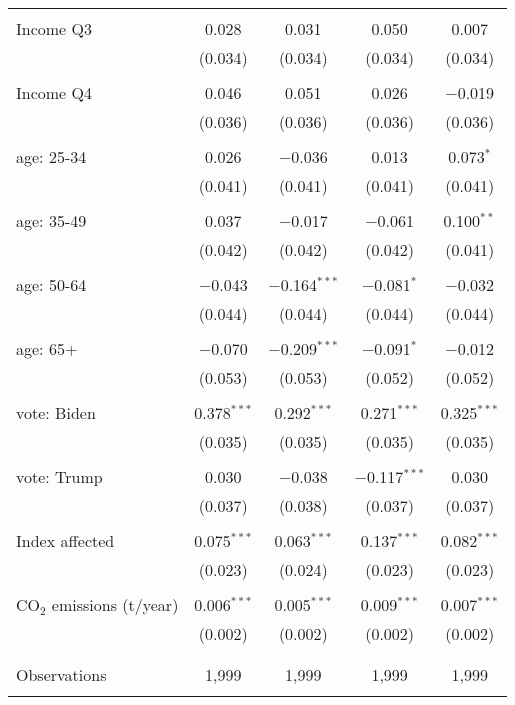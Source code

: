 \begin{tabular}{@{\extracolsep{5pt}}lcccc}
  & & & & \\ 
 Income Q3 & 0.028 & 0.031 & 0.050 & 0.007 \\ 
  & (0.034) & (0.034) & (0.034) & (0.034) \\ 
  & & & & \\ 
 Income Q4 & 0.046 & 0.051 & 0.026 & $-$0.019 \\ 
  & (0.036) & (0.036) & (0.036) & (0.036) \\ 
  & & & & \\ 
 age: 25-34 & 0.026 & $-$0.036 & 0.013 & 0.073$^{*}$ \\ 
  & (0.041) & (0.041) & (0.041) & (0.041) \\ 
  & & & & \\ 
 age: 35-49 & 0.037 & $-$0.017 & $-$0.061 & 0.100$^{**}$ \\ 
  & (0.042) & (0.042) & (0.042) & (0.041) \\ 
  & & & & \\ 
 age: 50-64 & $-$0.043 & $-$0.164$^{***}$ & $-$0.081$^{*}$ & $-$0.032 \\ 
  & (0.044) & (0.044) & (0.044) & (0.044) \\ 
  & & & & \\ 
 age: 65+ & $-$0.070 & $-$0.209$^{***}$ & $-$0.091$^{*}$ & $-$0.012 \\ 
  & (0.053) & (0.053) & (0.052) & (0.052) \\ 
  & & & & \\ 
 vote: Biden & 0.378$^{***}$ & 0.292$^{***}$ & 0.271$^{***}$ & 0.325$^{***}$ \\ 
  & (0.035) & (0.035) & (0.035) & (0.035) \\ 
  & & & & \\ 
 vote: Trump & 0.030 & $-$0.038 & $-$0.117$^{***}$ & 0.030 \\ 
  & (0.037) & (0.038) & (0.037) & (0.037) \\ 
  & & & & \\ 
 Index affected & 0.075$^{***}$ & 0.063$^{***}$ & 0.137$^{***}$ & 0.082$^{***}$ \\ 
  & (0.023) & (0.024) & (0.023) & (0.023) \\ 
  & & & & \\ 
 CO$_{2}$ emissions (t/year) & 0.006$^{***}$ & 0.005$^{***}$ & 0.009$^{***}$ & 0.007$^{***}$ \\ 
  & (0.002) & (0.002) & (0.002) & (0.002) \\ 
  & & & & \\ 
\hline \\[-1.8ex] 

Observations & 1,999 & 1,999 & 1,999 & 1,999 \\ 
\hline 
\hline \\[-1.8ex] 
\end{tabular} 